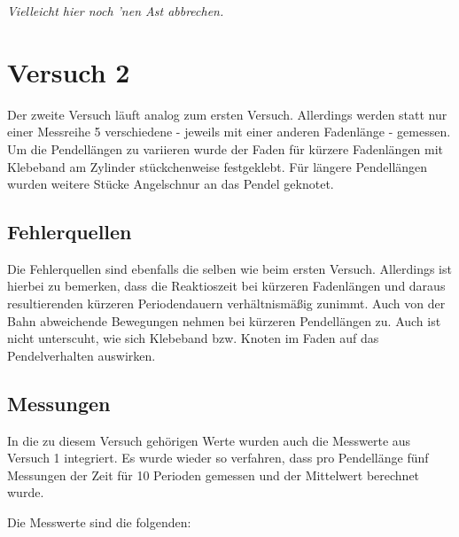 \documentclass[
  9pt,
]{article}
\begin{document}
\textit{Vielleicht hier noch 'nen Ast abbrechen.}

\newpage

\hypertarget{versuch-2}{%
\section{Versuch 2}\label{versuch-2}}

Der zweite Versuch läuft analog zum ersten Versuch. Allerdings werden
statt nur einer Messreihe 5 verschiedene - jeweils mit einer anderen
Fadenlänge - gemessen. Um die Pendellängen zu variieren wurde der Faden
für kürzere Fadenlängen mit Klebeband am Zylinder stückchenweise
festgeklebt. Für längere Pendellängen wurden weitere Stücke Angelschnur
an das Pendel geknotet.

\hypertarget{fehlerquellen-1}{%
\subsection{Fehlerquellen}\label{fehlerquellen-1}}

Die Fehlerquellen sind ebenfalls die selben wie beim ersten Versuch.
Allerdings ist hierbei zu bemerken, dass die Reaktioszeit bei kürzeren
Fadenlängen und daraus resultierenden kürzeren Periodendauern
verhältnismäßig zunimmt. Auch von der Bahn abweichende Bewegungen nehmen
bei kürzeren Pendellängen zu. Auch ist nicht unterscuht, wie sich
Klebeband bzw. Knoten im Faden auf das Pendelverhalten auswirken.

\hypertarget{messungen-1}{%
\subsection{Messungen}\label{messungen-1}}

In die zu diesem Versuch gehörigen Werte wurden auch die Messwerte aus
Versuch 1 integriert. Es wurde wieder so verfahren, dass pro Pendellänge
fünf Messungen der Zeit für 10 Perioden gemessen und der Mittelwert
berechnet wurde.

Die Messwerte sind die folgenden:
\end{document}
